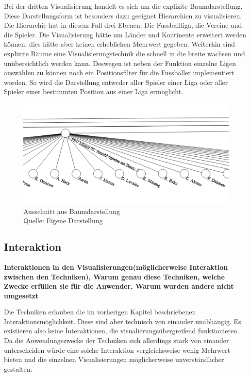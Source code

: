 \documentclass[usegeometry=true]{scrartcl}
\begin{document}
Bei der dritten Visualisierung handelt es sich um die explizite Baumdarstellung. Diese Darstellungsform ist besonders dazu geeignet Hierarchien zu visualisieren. 
Die Hierarchie hat in diesem Fall drei Ebenen: Die Fussballliga, die Vereine und die Spieler.
Die Visualisierung hätte um Länder und Kontinente erweitert werden können, dies hätte aber keinen erheblichen Mehrwert gegeben.
Weiterhin sind explizite Bäume eine Visualisierungstechnik die schnell in die breite wachsen und unübersichtlich werden kann. Deswegen ist neben der Funktion einzelne Ligen auswählen zu können noch ein Positionsfilter für die Fussballer implementiert worden. So wird die Darstellung entweder aller Spieler einer Liga oder aller Spieler einer bestimmten Position aus einer Liga ermöglicht.
\begin{figure}[h]
\centering
\includegraphics[scale=0.4]{grafiken/BaumDiagram1}
\caption{Ausschnitt aus Baumdarstellung\\ Quelle: Eigene Darstellung}
\end{figure}


\subsection{Interaktion}

\textbf{Interaktionen in den Visualisierungen(möglicherweise Interaktion zwischen den Techniken), Warum genau diese Techniken, welche Zwecke erfüllen sie für die Anwender, Warum wurden andere nicht umgesetzt}

Die Techniken erlauben die im vorherigen Kapitel beschriebenen Interaktionsmöglichkeit. Diese sind aber technisch von einander unabhängig. Es existieren also keine Interaktionen, die visualierungsübergreifend funktionieren. Da die Anwendungszwecke der Techniken sich allerdings stark von einander unterscheiden würde eine solche Interaktion vergleichsweise wenig Mehrwert bieten und die einzelnen Visualisierungen möglicherweise unverständlicher gestalten. 
\end{document}
